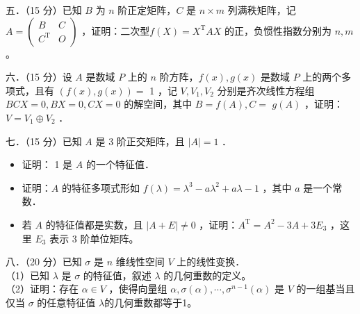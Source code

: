 \documentclass{article}
\begin{document}
五．（15 分）已知 \(B\) 为 \(n\) 阶正定矩阵，\(C\) 是 \(n \times m\) 列满秩矩阵，记 \(A=\left(\begin{array}{cc}B & C \\ C^{\mathrm{T}} & O\end{array}\right)\) ，证明：二次型\(f(X)=X^{\mathrm{T}} A X\) 的正，负惯性指数分别为 \(n, m\) 。

六．（15 分）设 \(A\) 是数域 \(P\) 上的 \(n\) 阶方阵，\(f(x), g(x)\) 是数域 \(P\) 上的两个多项式，且有 \((f(x), g(x))=\) 1 ，记 \(V, V_{1}, V_{2}\) 分别是齐次线性方程组 \(B C X=0, B X=0, C X=0\) 的解空间，其中 \(B=f(A), C=\) \(g(A)\) ，证明：\(V=V_{1} \oplus V_{2}\) ．

七．（15 分）已知 \(A\) 是 3 阶正交矩阵，且 \(|A|=1\) ．

\begin{itemize}
  \item[（1）] 证明： 1 是 \(A\) 的一个特征值．
  \item[（2）] 证明：\(A\) 的特征多项式形如 \(f(\lambda)=\lambda^{3}-a \lambda^{2}+a \lambda-1\) ，其中 \(a\) 是一个常数．
  \item[（3）] 若 \(A\) 的特征值都是实数，且 \(|A+E| \neq 0\) ，证明：\(A^{\mathrm{T}}=A^{2}-3 A+3 E_{3}\) ，这里 \(E_{3}\) 表示 3 阶单位矩阵。
\end{itemize}

八．（20 分）已知 \(\sigma\) 是 \(n\) 维线性空间 \(V\) 上的线性变换．\\
（1）已知 \(\lambda\) 是 \(\sigma\) 的特征值，叙述 \(\lambda\) 的几何重数的定义。\\
（2）证明：存在 \(\alpha \in V\) ，使得向量组 \(\alpha, \sigma(\alpha), \cdots, \sigma^{n-1}(\alpha)\) 是 \(V\) 的一组基当且仅当 \(\sigma\) 的任意特征值 \(\lambda\)的几何重数都等于1。
\end{document}
